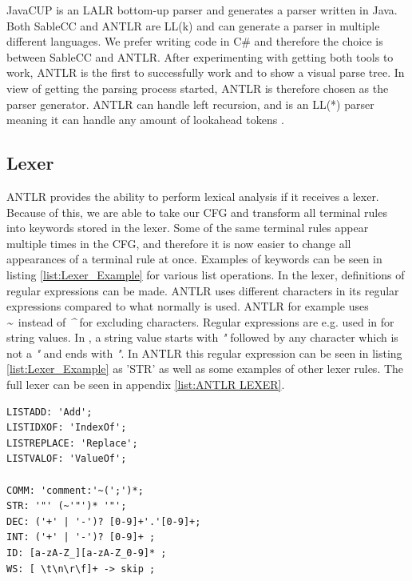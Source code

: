JavaCUP is an LALR bottom-up parser and generates a parser written in Java. Both SableCC and ANTLR are LL(k) and can generate a parser in multiple different languages. We prefer writing code in C\# and therefore the choice is between SableCC and ANTLR. After experimenting with getting both tools to work, ANTLR is the first to successfully work and to show a visual parse tree. In view of getting the parsing process started, ANTLR is therefore chosen as the parser generator. ANTLR can handle left recursion, and is an LL(*) parser meaning it can handle any amount of lookahead tokens \cite{ParsingGuide}.

\subsection{Lexer}
ANTLR provides the ability to perform lexical analysis if it receives a lexer. Because of this, we are able to take our CFG and transform all terminal rules into keywords stored in the lexer. Some of the same terminal rules appear multiple times in the CFG, and therefore it is now easier to change all appearances of a terminal rule at once. Examples of keywords can be seen in listing \ref{list:Lexer_Example} for various list operations. In the lexer, definitions of regular expressions can be made. ANTLR uses different characters in its regular expressions compared to what normally is used. ANTLR for example uses \textit{\~}\ instead of \textit{\^} for excluding characters. Regular expressions are e.g. used in \lang for string values. In \lang, a string value starts with \textit{"} followed by any character which is not a \textit{"} and ends with \textit{"}. In ANTLR this regular expression can be seen in listing \ref{list:Lexer_Example} as 'STR' as well as some examples of other lexer rules. The full lexer can be seen in appendix \ref{list:ANTLR LEXER}.

\begin{lstlisting}[label={list:Lexer_Example}, captionpos=b, caption=Part of \lang's Lexer - CobraCompiler/ExprLexer.txt]
LISTADD: 'Add';
LISTIDXOF: 'IndexOf';
LISTREPLACE: 'Replace';
LISTVALOF: 'ValueOf';

COMM: 'comment:'~(';')*;
STR: '"' (~'"')* '"';
DEC: ('+' | '-')? [0-9]+'.'[0-9]+; 
INT: ('+' | '-')? [0-9]+ ;
ID: [a-zA-Z_][a-zA-Z_0-9]* ; 
WS: [ \t\n\r\f]+ -> skip ; 
\end{lstlisting}

